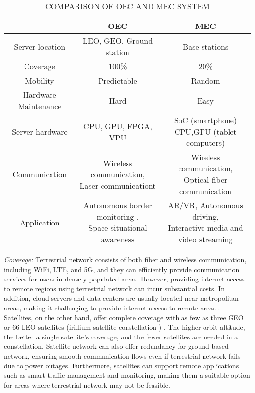 \documentclass[lettersize,journal]{IEEEtran}
\begin{document}
\begin{table*}[htbp!]
  \centering
  \caption{COMPARISON OF OEC AND MEC SYSTEM}
  \label{tab1}
  \begin{tabular}{ccc} \hline
                  & OEC & MEC \\ \hline
  Server location & LEO, GEO, Ground station  &  Base stations \cite{RN167} \\ \hline    
  Coverage        & 100\%                     &  20\% \cite{RN4}  \\ \hline  %
  Mobility        & Predictable               & Random                       \\ \hline 
  Hardware Maintenance   & Hard              &  Easy                           \\ \hline   
  Server hardware & CPU, GPU, FPGA, VPU \cite{RN56}  & \makecell[c]{SoC (smartphone) \\ CPU,GPU (tablet computers) \cite{RN155} } \\ \hline 
  Communication   & \makecell[c]{Wireless communication, \\Laser communicationt}  & \makecell[c]{Wireless communication, \\Optical-fiber communication} \\ \hline %
  Application   & \makecell[c]{Autonomous border monitoring \cite{RN55},\\ Space situational awareness\cite{lei2021maddpg}}    & \makecell[c]{AR/VR, Autonomous driving\cite{RN174}, \\ Interactive media and video streaming \cite{RN175}\\}   \\ \hline
  \end{tabular}
\end{table*}

\emph{Coverage:} 
Terrestrial network consists of both fiber and wireless communication, including WiFi, LTE, and 5G, and they can efficiently provide communication services for users in densely populated areas. However, providing internet access to remote regions using terrestrial network can incur substantial costs. In addition, cloud servers and data centers are usually located near metropolitan areas, making it challenging to provide internet access to remote areas \cite{RN102}. Satellites, on the other hand, offer complete coverage with as few as three GEO or 66 LEO satellites (iridium satellite constellation \cite{RN173}) . The higher orbit altitude, the better a single satellite's coverage, and the fewer satellites are needed in a constellation. Satellite network can also offer redundancy for ground-based network, ensuring smooth communication flows even if terrestrial network fails due to power outages. Furthermore, satellites can support remote applications such as smart traffic management and monitoring, making them a suitable option for areas where terrestrial network may not be feasible.
\end{document}
